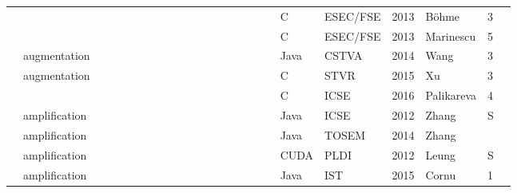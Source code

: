 \begin{table*}
\begin{adjustbox}{max width=\textwidth,center=\textwidth}
\begin{tabular}{llllllllllllllllllllllll}
            \cite{bohme2013regression}                      &                                   &    & \X &    &    & \X &    & \X &    &    &    &    & \X &    &    & \X & \X & C           & ESEC/FSE                                                 & 2013 & B\"ohme        & 3 \\
            \cite{marinescu2013katch}                       &                                   &    & \X &    &    & \X &    &    &    &    &    &    & \X &    &    & \X & \X & C           & ESEC/FSE                                                 & 2013 & Marinescu      & 5 \\
            \cite{xwang2014directed}                        & augmentation                      &    & \X &    &    & \X &    &    &    &    & \X &    & \X &    &    & \X &    & Java        & CSTVA                                                    & 2014 & Wang           & 3 \\
            \cite{xu2015directed}                           & augmentation                      &    & \X &    &    & \X &    &    &    &    &    &    & \X &    & \X &    & \X & C           & STVR                                                     & 2015 & Xu             & 3 \\
            \cite{palikareva2016shadow}                     &                                   &    & \X &    &    & \X &    &    &    &    & \X &    & \X &    &    & \X &    & C           & ICSE                                                     & 2016 & Palikareva     & 4 \\
            \cite{zhang2012}                                & amplification                     &    &    & \X &    &    &    & \X &    &    &    &    & \X & \X &    &    &    & Java        & ICSE                                                     & 2012 & Zhang          & S \\
            \cite{ZhangE14}                                 & amplification                     &    &    & \X &    &    &    & \X &    &    &    &    & \X & \X &    &    &    & Java        & TOSEM                                                    & 2014 & Zhang          & \\
            \cite{leung12}                                  & amplification                     &    &    & \X &    &    &    & \X &    &    &    &    & \X &    &    &    &    & CUDA        & PLDI                                                     & 2012 & Leung          & S \\
            \cite{cornu2015exception}                       & amplification                     &    &    & \X &    &    &    & \X &    & \X &    &    & \X & \X &    &    &    & Java        & IST                                                      & 2015 & Cornu          & 1 \\

\end{tabular}
\end{adjustbox}
\end{table*}
